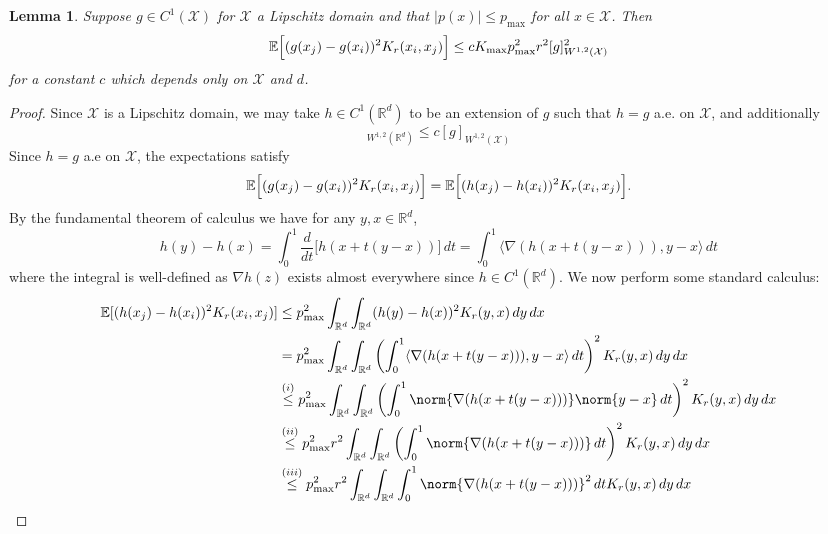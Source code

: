 \documentclass{article}
\newcommand{\Reals}{\mathbb{R}}
\newcommand{\abs}[1]{\left \lvert #1 \right \rvert}
\newcommand{\1}{\mathbf{1}}
\newcommand{\Rd}{\Reals^d}
\newcommand{\Xset}{\mathcal{X}}
\newcommand{\Ebb}{\mathbb{E}}
\newcommand{\dotp}[2]{\langle #1, #2 \rangle}
\theoremstyle{alden}
\theoremstyle{aldenthm}
\newtheorem{lemma}{Lemma}
\theoremstyle{definition}
\theoremstyle{remark}
\begin{document}
\begin{lemma}
	\label{lem:expected_first_order_seminorm}
	Suppose $g \in C^{1}(\Xset)$ for $\Xset$ a Lipschitz domain and that $\abs{p(x)} \leq p_{\max}$ for all $x \in \Xset$. Then
	\begin{equation*}
	\Ebb\Bigl[(g(x_j) - g(x_i))^2K_r(x_i,x_j)\Bigr] \leq c K_{\max} p_{\max}^2 r^2 [g]_{W^{1,2}(\Xset)}^2
	\end{equation*}
	for a constant $c$ which depends only on $\Xset$ and $d$.
\end{lemma}
\begin{proof}
	Since $\Xset$ is a Lipschitz domain, we may take $h \in C^1(\Rd)$ to be an extension of $g$ such that $h = g$ a.e. on $\Xset$, and additionally
	\begin{equation*}
	[h]_{W^{1,2}(\Rd)} \leq c[g]_{W^{1,2}(\Xset)}
	\end{equation*}
	Since $h = g$ a.e on $\Xset$, the expectations satisfy
	\begin{equation*}
	\Ebb\Bigl[(g(x_j) - g(x_i))^2K_r(x_i,x_j)\Bigr] = \Ebb\Bigl[(h(x_j) - h(x_i))^2K_r(x_i,x_j)\Bigr].
	\end{equation*}
	By the fundamental theorem of calculus we have for any $y,x \in \Rd$,
	\begin{equation}
	\label{eqn:expected_first_order_seminorm_pf1}
	h(y) - h(x) = \int_{0}^{1} \frac{d}{dt}\bigl[h(x + t(y - x))\bigr] \,dt = \int_{0}^{1} \dotp{\nabla(h(x + t(y - x)))}{y - x} \,dt
	\end{equation}
	where the integral is well-defined as $\nabla h(z)$ exists almost everywhere since $h \in C^1(\Rd)$. We now perform some standard calculus:
	\begin{align*}
	\Ebb[(h(x_j) - h(x_i))^2K_r(x_i,x_j)] & \leq p_{\max}^2 \int_{\Rd} \int_{\Rd} (h(y) - h(x))^2 K_r(y,x) \,dy \,dx\\
	& = p_{\max}^2 \int_{\Rd} \int_{\Rd} \left(\int_{0}^{1} \dotp{\nabla(h(x + t(y - x)))}{y - x} \,dt\right)^2 K_r(y,x) \,dy \,dx \\
	& \overset{(i)}{\leq} p_{\max}^2 \int_{\Rd} \int_{\Rd} \left(\int_{0}^{1} \norm{\nabla(h(x + t(y - x)))}\norm{y - x} \,dt\right)^2 K_r(y,x) \,dy \,dx \\
	& \overset{(ii)}{\leq} p_{\max}^2 r^2\int_{\Rd} \int_{\Rd} \left(\int_{0}^{1} \norm{\nabla(h(x + t(y - x)))}\,dt\right)^2 K_r(y,x) \,dy \,dx \\
	& \overset{(iii)}{\leq} p_{\max}^2 r^2\int_{\Rd} \int_{\Rd} \int_{0}^{1} \norm{\nabla(h(x + t(y - x)))}^2 \,dt K_r(y,x) \,dy \,dx \\

\end{align*}
\end{proof}
\end{document}
